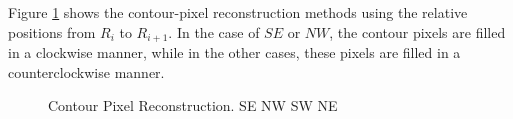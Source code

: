 Figure \ref{fig:image12} shows the contour-pixel reconstruction methods using the relative positions from $R_i$ to $R_{i+1}$. In the case of $SE$ or $NW$, the contour pixels are filled in a clockwise manner, while in the other cases, these pixels are filled in a counterclockwise manner.

\begin{figure}[htbp]
	\centering
	\caption{Contour Pixel Reconstruction. \protect{} SE \protect{} NW \protect{} SW \protect{} NE}
	\label{fig:image12}
\end{figure}

